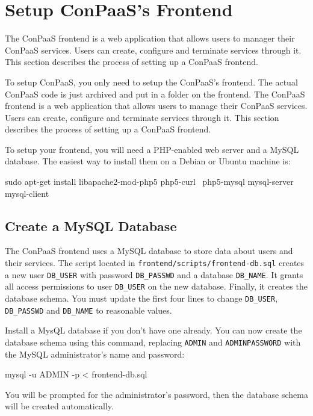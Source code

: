 \documentclass[10pt]{article}
\begin{document}
\section{Setup ConPaaS's Frontend}
\label{sec:frontend}

The ConPaaS frontend is a web application that allows users to manager
their ConPaaS services. Users can create, configure and terminate
services through it. This section describes the process of setting up
a ConPaaS frontend.

To setup ConPaaS, you only need to setup the ConPaaS's frontend. The
actual ConPaaS code is just archived and put in a folder on the frontend.
The ConPaaS frontend is a web application that allows users to manage
their ConPaaS services. Users can create, configure and terminate
services through it. This section describes the process of setting up
a ConPaaS frontend.

To setup your frontend, you will need a PHP-enabled web server and a
MySQL database. The easiest way to install them on a Debian or Ubuntu
machine is:

\begin{code}
  sudo apt-get install libapache2-mod-php5 php5-curl \
     php5-mysql mysql-server mysql-client
\end{code}

\subsection{Create a MySQL Database}

The ConPaaS frontend uses a MySQL database to store data about users
and their services. The script located in
\verb+frontend/scripts/frontend-db.sql+ creates a new user
\verb+DB_USER+ with password \verb+DB_PASSWD+ and a database
\verb+DB_NAME+. It grants all access permissions to user
\verb+DB_USER+ on the new database. Finally, it creates the database
schema. You must update the first four lines to change \verb+DB_USER+,
\verb+DB_PASSWD+ and \verb+DB_NAME+ to reasonable values.

Install a MysQL database if you don't have one already. You can now
create the database schema using this command, replacing \verb+ADMIN+
and \verb+ADMINPASSWORD+ with the MySQL administrator's name and
password:

\begin{code}
  mysql -u ADMIN -p < frontend-db.sql
\end{code}


You will be prompted for the administrator's password, then the
database schema will be created automatically.
\end{document}
